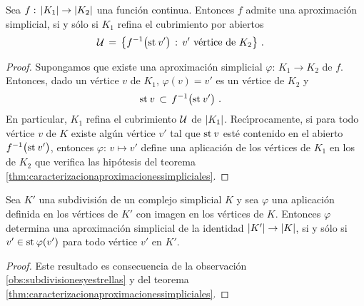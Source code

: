 \begin{propoCaracterizacionDeAproximables}%
	\label{thm:caracterizaciondeaproximables}
	Sea $f:\,\geom{K_{1}}\rightarrow\geom{K_{2}}$ una funci\'{o}n
	continua. Entonces $f$ admite una aproximaci\'{o}n simplicial,
	si y s\'{o}lo si $K_{1}$ refina el cubrimiento por abiertos
	\begin{align*}
		\cal U & \,=\, \big\{f^{-1}\big(\estrella v'\big)\,:\,
			v'\text{ v\'{e}rtice de }K_{2}\big\}
		\text{ .}
	\end{align*}
\end{propoCaracterizacionDeAproximables}

\begin{proof}
	Supongamos que existe una aproximaci\'{o}n simplicial
	$\varphi:\,K_{1}\rightarrow K_{2}$ de $f$. Entonces, dado un
	v\'{e}rtice $v$ de $K_{1}$, $\varphi(v)=v'$ es un v\'{e}rtice de
	$K_{2}$ y
	\begin{align*}
		\estrella v & \,\subset\,f^{-1}\big(\estrella v'\big)
		\text{ .}
	\end{align*}
	En particular, $K_{1}$ refina el cubrimiento $\cal U$ de
	$\geom{K_{1}}$. Rec\'{\i}procamente, si para todo v\'{e}rtice $v$ de
	$K$ existe alg\'{u}n v\'{e}rtice $v'$ tal que $\estrella v$ est\'{e}
	contenido en el abierto $f^{-1}\big(\estrella v'\big)$, entonces
	$\varphi:\,v\mapsto v'$ define una aplicaci\'{o}n de los v\'{e}rtices
	de $K_{1}$ en los de $K_{2}$ que verifica las hip\'{o}tesis del
	teorema \ref{thm:caracterizacionaproximacionessimpliciales}.
\end{proof}

\begin{coroCaracterizacionDeAproximacionesPorSubdivision}%
	\label{thm:caracterizaciondeaproximacionesporsubdivision}
	Sea $K'$ una subdivisi\'{o}n de un complejo simplicial $K$ y sea
	$\varphi$ una aplicaci\'{o}n definida en los v\'{e}rtices de $K'$
	con imagen en los v\'{e}rtices de $K$. Entonces $\varphi$ determina
	una aproximaci\'{o}n simplicial de la identidad
	$\geom{K'}\rightarrow\geom{K}$, si y s\'{o}lo si
	$v'\in\estrella{\varphi(v')}$ para todo v\'{e}rtice $v'$ en $K'$.
\end{coroCaracterizacionDeAproximacionesPorSubdivision}

\begin{proof}
	Este resultado es consecuencia de la observaci\'{o}n
	\ref{obs:subdivisionesyestrellas} y del teorema
	\ref{thm:caracterizacionaproximacionessimpliciales}.
\end{proof}

